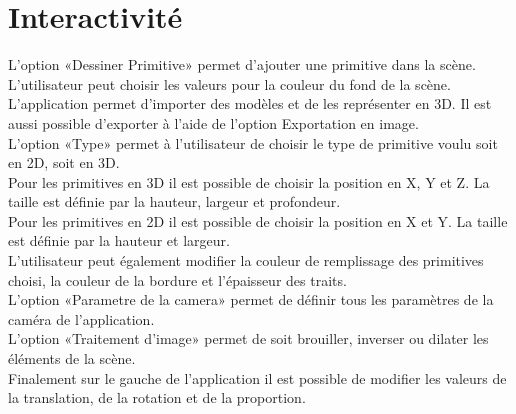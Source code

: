 \chapter{Interactivité}
\label{s:interactivite}

L’option «Dessiner Primitive» permet d’ajouter une primitive dans la scène. L’utilisateur peut choisir les valeurs pour la couleur du fond de la scène. \\
L’application permet d’importer des modèles et de les représenter en 3D. Il est aussi possible d’exporter à l’aide de l’option Exportation en image. \\
L’option «Type» permet à l’utilisateur de choisir le type de primitive voulu soit en 2D, soit en 3D. \\
Pour les primitives en 3D il est possible de choisir la position en X, Y et Z. La taille est définie par la hauteur, largeur et profondeur.\\
Pour les primitives en 2D il est possible de choisir la position en X et Y.  La taille est définie par la hauteur et largeur.\\
L’utilisateur peut également modifier la couleur de remplissage des primitives choisi, la couleur de la bordure et l’épaisseur des traits.\\ 
L’option «Parametre de la camera» permet de définir tous les paramètres de la caméra de l’application. \\
L’option «Traitement d’image» permet de soit brouiller, inverser ou dilater les éléments de la scène.  \\
Finalement sur le gauche de l’application il est possible de modifier les valeurs de la translation, de la rotation et de la proportion.\\
